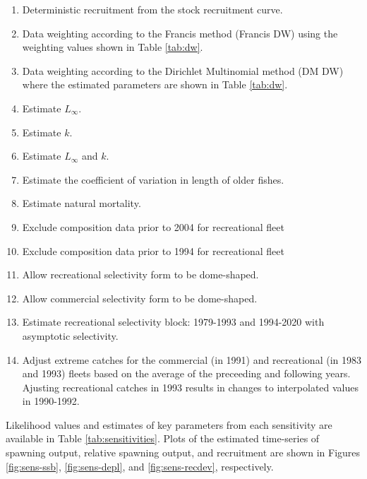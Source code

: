 \documentclass[11pt,
  english,
  a4paper,
]{article}
\begin{document}
\begin{enumerate}
   
  \item Deterministic recruitment from the stock recruitment curve. 

  \item Data weighting according to the Francis method (Francis DW) using the weighting values shown in Table \ref{tab:dw}. 
  
  \item Data weighting according to the Dirichlet Multinomial method (DM DW) where the estimated parameters are shown in Table \ref{tab:dw}. 

  \item Estimate $L_{\infty}$.
  
  \item Estimate $k$.
  
  \item Estimate $L_{\infty}$ and $k$.

  \item Estimate the coefficient of variation in length of older fishes.

  \item Estimate natural mortality.
  
  \item Exclude composition data prior to 2004 for recreational fleet
  
  \item Exclude composition data prior to 1994 for recreational fleet

  \item Allow recreational selectivity form to be dome-shaped. 
  
  \item Allow commercial selectivity form to be dome-shaped.
  
  \item Estimate recreational selectivity block: 1979-1993 and 1994-2020 with asymptotic selectivity.  

  \item Adjust extreme catches for the commercial (in 1991) and recreational (in 1983 and 1993) fleets based on the average of the preceeding and following years. Ajusting recreational catches in 1993 results in changes to interpolated values in 1990-1992.     
  
\end{enumerate}


Likelihood values and estimates of key parameters from each sensitivity are available in Table \ref{tab:sensitivities}. Plots of the estimated time-series of spawning output, relative spawning output, and recruitment are shown in Figures \ref{fig:sens-ssb}, \ref{fig:sens-depl}, and \ref{fig:sens-recdev}, respectively.
\end{document}
